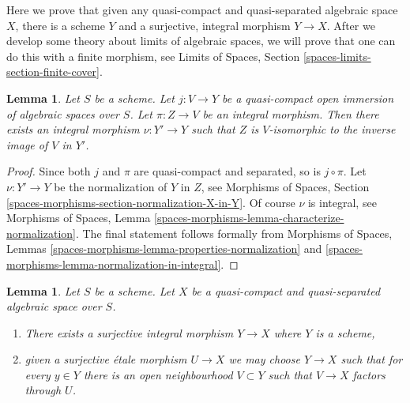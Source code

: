 \documentclass{stacks-project}
\theoremstyle{plain}
\newtheorem{lemma}[subsection]{Lemma}
\theoremstyle{definition}
\theoremstyle{remark}
\numberwithin{equation}{subsection}
\begin{document}
\noindent
Here we prove that given any quasi-compact and quasi-separated
algebraic space $X$, there is a scheme $Y$ and a surjective, integral
morphism $Y \to X$. After we develop some theory about limits of
algebraic spaces, we will prove that one can do this with a finite
morphism, see
Limits of Spaces, Section \ref{spaces-limits-section-finite-cover}.

\begin{lemma}
\label{lemma-extend-integral-morphism}
Let $S$ be a scheme. Let $j : V \to Y$ be a quasi-compact open immersion
of algebraic spaces over $S$. Let $\pi : Z \to V$ be an integral morphism.
Then there exists an integral morphism $\nu : Y' \to Y$ such that
$Z$ is $V$-isomorphic to the inverse image of $V$ in $Y'$.
\end{lemma}

\begin{proof}
Since both $j$ and $\pi$ are quasi-compact and separated, so is
$j \circ \pi$. Let $\nu : Y' \to Y$ be the normalization of $Y$ in $Z$, see
Morphisms of Spaces, Section
\ref{spaces-morphisms-section-normalization-X-in-Y}.
Of course $\nu$ is integral, see
Morphisms of Spaces, Lemma
\ref{spaces-morphisms-lemma-characterize-normalization}.
The final statement follows formally from
Morphisms of Spaces, Lemmas
\ref{spaces-morphisms-lemma-properties-normalization} and
\ref{spaces-morphisms-lemma-normalization-in-integral}.
\end{proof}

\begin{lemma}
\label{lemma-there-is-a-scheme-integral-over}
Let $S$ be a scheme. Let $X$ be a quasi-compact and quasi-separated
algebraic space over $S$.
\begin{enumerate}
\item There exists a surjective integral morphism $Y \to X$ where $Y$
is a scheme,
\item given a surjective \'etale morphism $U \to X$ we may choose
$Y \to X$ such that for every $y \in Y$ there is an open neighbourhood
$V \subset Y$ such that $V \to X$ factors through $U$.
\end{enumerate}
\end{lemma}
\end{document}
